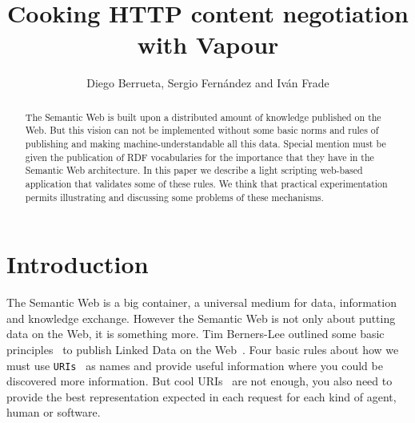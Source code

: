 \documentclass{../templates/llncs}
\begin{document}
\title{Cooking HTTP content negotiation with Vapour}

\author{Diego Berrueta, Sergio Fern\'andez and Iv\'an Frade}


\maketitle

\begin{abstract}
The Semantic Web is built upon a distributed amount of knowledge published on 
the Web. But this vision can not be implemented without some basic norms and 
rules of publishing and making machine-understandable all this data. Special 
mention must be given the publication of RDF vocabularies for the importance that
they have in the Semantic Web architecture. In this paper we describe a light 
scripting web-based application that validates some of these rules. We think 
that practical experimentation permits illustrating and discussing some
problems of these mechanisms.
\end{abstract}

\section{Introduction}

The Semantic Web is a big container, a universal medium for data, information
and knowledge exchange. However the Semantic Web is not only about putting data on
the Web, it is something more. Tim Berners-Lee outlined some basic 
principles~\cite{TimBL2006} to publish Linked Data on the Web~\cite{PublishLinkedData2007}.
Four basic rules about how we must use \texttt{URIs}~\cite{RFC3986} as names 
and provide useful information where you could be discovered more information. 
But cool URIs~\cite{Sauermann2007} are not enough, you also need to provide 
the best representation expected in each request for each kind of agent, human 
or software.
\end{document}
